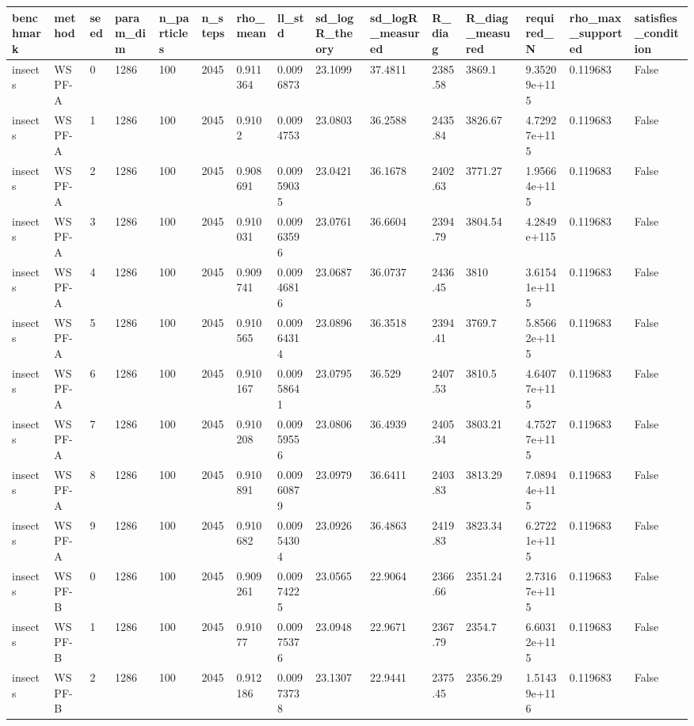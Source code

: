 \begin{tabular}{lllllllllllllll}
\hline
benchmark & method & seed & param\_dim & n\_particles & n\_steps & rho\_mean & ll\_std & sd\_logR\_theory & sd\_logR\_measured & R\_diag & R\_diag\_measured & required\_N & rho\_max\_supported & satisfies\_condition \\
\hline
insects & WSPF-A & 0 & 1286 & 100 & 2045 & 0.911364 & 0.0096873 & 23.1099 & 37.4811 & 2385.58 & 3869.1 & 9.35209e+115 & 0.119683 & False \\
insects & WSPF-A & 1 & 1286 & 100 & 2045 & 0.9102 & 0.0094753 & 23.0803 & 36.2588 & 2435.84 & 3826.67 & 4.72927e+115 & 0.119683 & False \\
insects & WSPF-A & 2 & 1286 & 100 & 2045 & 0.908691 & 0.00959035 & 23.0421 & 36.1678 & 2402.63 & 3771.27 & 1.95664e+115 & 0.119683 & False \\
insects & WSPF-A & 3 & 1286 & 100 & 2045 & 0.910031 & 0.00963596 & 23.0761 & 36.6604 & 2394.79 & 3804.54 & 4.2849e+115 & 0.119683 & False \\
insects & WSPF-A & 4 & 1286 & 100 & 2045 & 0.909741 & 0.00946816 & 23.0687 & 36.0737 & 2436.45 & 3810 & 3.61541e+115 & 0.119683 & False \\
insects & WSPF-A & 5 & 1286 & 100 & 2045 & 0.910565 & 0.00964314 & 23.0896 & 36.3518 & 2394.41 & 3769.7 & 5.85662e+115 & 0.119683 & False \\
insects & WSPF-A & 6 & 1286 & 100 & 2045 & 0.910167 & 0.00958641 & 23.0795 & 36.529 & 2407.53 & 3810.5 & 4.64077e+115 & 0.119683 & False \\
insects & WSPF-A & 7 & 1286 & 100 & 2045 & 0.910208 & 0.00959556 & 23.0806 & 36.4939 & 2405.34 & 3803.21 & 4.75277e+115 & 0.119683 & False \\
insects & WSPF-A & 8 & 1286 & 100 & 2045 & 0.910891 & 0.00960879 & 23.0979 & 36.6411 & 2403.83 & 3813.29 & 7.08944e+115 & 0.119683 & False \\
insects & WSPF-A & 9 & 1286 & 100 & 2045 & 0.910682 & 0.00954304 & 23.0926 & 36.4863 & 2419.83 & 3823.34 & 6.27221e+115 & 0.119683 & False \\
insects & WSPF-B & 0 & 1286 & 100 & 2045 & 0.909261 & 0.00974225 & 23.0565 & 22.9064 & 2366.66 & 2351.24 & 2.73167e+115 & 0.119683 & False \\
insects & WSPF-B & 1 & 1286 & 100 & 2045 & 0.91077 & 0.00975376 & 23.0948 & 22.9671 & 2367.79 & 2354.7 & 6.60312e+115 & 0.119683 & False \\
insects & WSPF-B & 2 & 1286 & 100 & 2045 & 0.912186 & 0.00973738 & 23.1307 & 22.9441 & 2375.45 & 2356.29 & 1.51439e+116 & 0.119683 & False \\

\end{tabular}
